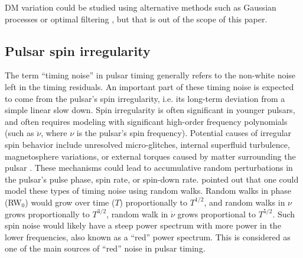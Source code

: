 DM variation could be studied using alternative methods such as Gaussian processes 
\citep{vv14a} or optimal filtering \citep{lbj+14}, but that is out of the scope of 
this paper.

\subsection{Pulsar spin irregularity}
\label{sec:spin}

The term ``timing noise'' in pulsar timing generally refers to the non-white
noise left in the timing residuals.
An important part of these timing noise is expected to come from the pulsar's spin
irregularity, i.e. its long-term deviation from a simple linear slow down. 
Spin irregularity is often significant in younger pulsars, and often
requires modeling with significant high-order frequency polynomials (such as $\ddot{\nu}$, where $\nu$ is the pulsar's spin frequency). 
Potential causes of irregular spin behavior include unresolved
micro-glitches, internal superfluid turbulence, magnetosphere variations, or external torques caused by matter surrounding the pulsar \citep{hlk10, ymh+13, ml14}.
These mechanisms could lead to accumulative random perturbations in the 
pulsar's pulse phase, spin rate, or spin-down rate. 
\citet{sc10} pointed out that one could model these types of timing noise using random walks.
Random walks in phase (RW$_0$) would grow over time ($T$)
proportionally to $T^{1/2}$, and random walks in $\nu$ grows proportionally to $T^{3/2}$, random walk in
$\dot{\nu}$ grows proportional to $T^{5/2}$.
Such spin noise would likely have a steep power spectrum with more power in
the lower frequencies, also known as a ``red'' power spectrum. This
is considered as one of the main sources of ``red'' noise in pulsar timing.


